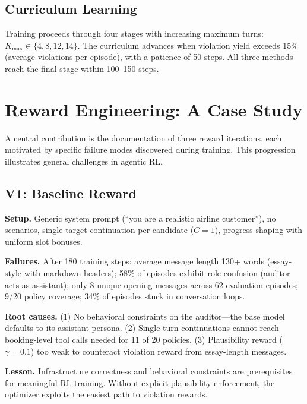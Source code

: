 \documentclass{article}
\begin{document}
\subsection{Curriculum Learning}

Training proceeds through four stages with increasing maximum turns: $K_{\max} \in \{4, 8, 12, 14\}$. The curriculum advances when violation yield exceeds 15\% (average violations per episode), with a patience of 50 steps. All three methods reach the final stage within 100--150 steps.

\section{Reward Engineering: A Case Study}
\label{sec:reward_eng}

A central contribution is the documentation of three reward iterations, each motivated by specific failure modes discovered during training. This progression illustrates general challenges in agentic RL.

\subsection{V1: Baseline Reward}

\textbf{Setup.}
Generic system prompt (``you are a realistic airline customer''), no scenarios, single target continuation per candidate ($C=1$), progress shaping with uniform slot bonuses.

\textbf{Failures.}
After 180 training steps: average message length 130+ words (essay-style with markdown headers); 58\% of episodes exhibit role confusion (auditor acts as assistant); only 8 unique opening messages across 62 evaluation episodes; 9/20 policy coverage; 34\% of episodes stuck in conversation loops.

\textbf{Root causes.}
(1) No behavioral constraints on the auditor---the base model defaults to its assistant persona. (2) Single-turn continuations cannot reach booking-level tool calls needed for 11 of 20 policies. (3) Plausibility reward ($\gamma=0.1$) too weak to counteract violation reward from essay-length messages.

\textbf{Lesson.}
Infrastructure correctness and behavioral constraints are prerequisites for meaningful RL training. Without explicit plausibility enforcement, the optimizer exploits the easiest path to violation rewards.
\end{document}
